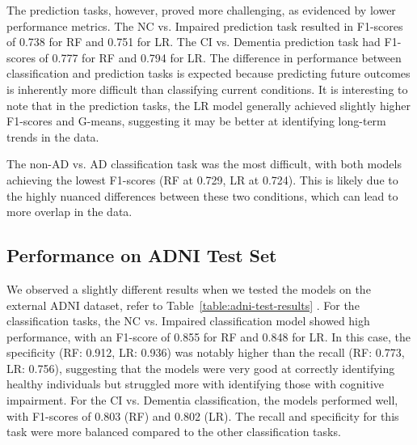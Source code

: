 The prediction tasks, however, proved more challenging, as evidenced by lower performance metrics. The NC vs. Impaired prediction task resulted in F1-scores of 0.738 for RF and 0.751 for LR. The CI vs. Dementia prediction task had F1-scores of 0.777 for RF and 0.794 for LR. The difference in performance between classification and prediction tasks is expected because predicting future outcomes is inherently more difficult than classifying current conditions. It is interesting to note that in the prediction tasks, the LR model generally achieved slightly higher F1-scores and G-means, suggesting it may be better at identifying long-term trends in the data.

The non-AD vs. AD classification task was the most difficult, with both models achieving the lowest F1-scores (RF at 0.729, LR at 0.724). This is likely due to the highly nuanced differences between these two conditions, which can lead to more overlap in the data.

\subsection{Performance on ADNI Test Set}
We observed a slightly different results when we tested the models on the external ADNI dataset, refer to Table~\ref{table:adni-test-results} . For the classification tasks, the NC vs. Impaired classification model showed high performance, with an F1-score of 0.855 for RF and 0.848 for LR. In this case, the specificity (RF: 0.912, LR: 0.936) was notably higher than the recall (RF: 0.773, LR: 0.756), suggesting that the models were very good at correctly identifying healthy individuals but struggled more with identifying those with cognitive impairment. For the CI vs. Dementia classification, the models performed well, with F1-scores of 0.803 (RF) and 0.802 (LR). The recall and specificity for this task were more balanced compared to the other classification tasks.

